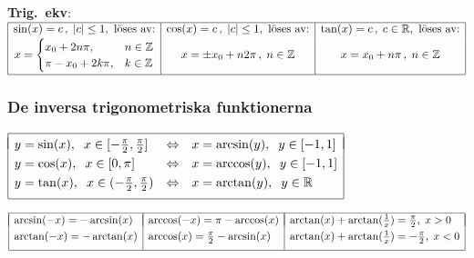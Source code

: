 \documentclass{article}
\begin{document}
\medskip
\textbf{Trig.~ekv}:
\hbox{ 
$
\begin{array}[t]{|c|c|c|}
  \hline
  \sin(x)=c\,, \;|c|\leq 1,      \mbox{ löses av:} &
  \cos(x)=c\,, \;|c|\leq 1,      \mbox{ löses av:} &
  \tan(x)=c\,, \;c\in\mathbb{R}, \mbox{ löses av:}
\\[2pt]
x=
\begin{cases}
     x_0+2n\pi,   & n\in\mathbb{Z}\cr
    \pi-x_0+2k\pi,& k\in\mathbb{Z}
\end{cases}
&
x=\pm x_0+n2\pi\,,\;n\in\mathbb{Z}
&x=x_0+n\pi\,,\;n\in\mathbb{Z}
\\[11pt]
\hline
\end{array}
$} %

\subsubsection*{De inversa trigonometriska funktionerna}%

$\begin{array}{|lll|}\hline && \\*[-9pt] 
  y=\sin(x),\hspace{2 mm} x\in[-\frac{\pi}{2},\frac{\pi}{2}]&
  \iff &
  x=\arcsin(y),\hspace{2 mm} y\in[-1,1] \EndRow 
  y=\cos(x),\hspace{2 mm} x\in[0,\pi]&
  \iff &
  x=\arccos(y),\hspace{2 mm} y\in[-1,1] \EndRow 
  y=\tan(x),\hspace{2 mm} x\in(-\frac{\pi}{2},\frac{\pi}{2})&
  \iff &
  x=\arctan(y), \hspace{2 mm} y\in\mathbb{R}\\*[6pt]\hline
\end{array}$  

\vspace{1 mm}

$\begin{array}{|l|l|l|}\hline & & \\*[-11pt]
\arcsin(-x)=-\arcsin(x) & \arccos(-x)=\pi-\arccos(x) & 
  \arctan(x)+\arctan(\tfrac1x)=\frac\pi2, \; x>0 \EndRow %
\arctan(-x)=-\arctan(x) &\arccos(x)=\frac{\pi}{2}-\arcsin(x) & 
  \arctan(x)+\arctan(\tfrac1x)=-\frac\pi2, \; x < 0 \\*[6pt] %
\hline
\end{array}$%
\end{document}
